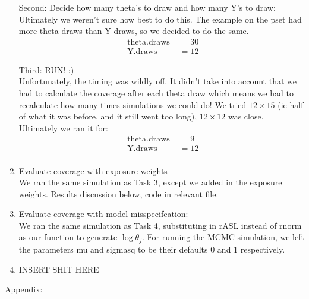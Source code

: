\documentclass[paper=a4, fontsize=11pt]{scrartcl}
\begin{document}
\begin{enumerate}
      Second: Decide how many theta's to draw and how many Y's to draw: \\
        Ultimately we weren't sure how best to do this. The example on the pset had more theta draws than Y draws, so we decided to do the same.
        \begin{align*}
          \text{ theta.draws } &= 30 \\
          \text{ Y.draws } &= 12
        \end{align*}

      Third: RUN! :) \\

      Unfortunately, the timing was wildly off. It didn't take into account that we had to calculate the coverage after each theta draw which means we had to recalculate how many times simulations we could do! We tried $12 \times 15$ (ie half of what it was before, and it still went too long), $12 \times 12$ was close. Ultimately we ran it for:
      \begin{align*}
        \text{ theta.draws } &= 9 \\
        \text{ Y.draws} &= 12 \\
      \end{align*}

    \item Evaluate coverage with exposure weights \\

      We ran the same simulation as Task 3, except we added in the exposure weights. Results discussion below, code in relevant file.
    \item Evaluate coverage with model misspecifcation: \\

      We ran the same simulation as Task 4, substituting in rASL instead of rnorm as our function to generate $\log{\theta_j}$. For running the MCMC simulation, we left the parameters mu and sigmasq to be their defaults $0$ and $1$ respectively.
    \item INSERT SHIT HERE
  \end{enumerate}
Appendix: \\
\end{document}
